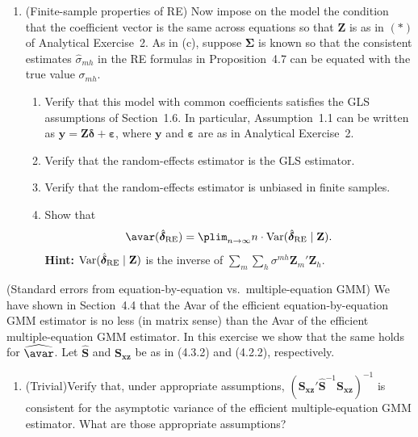 \begin{problemset}
\begin{enumerate}[label=(\alph*)]
\item (Finite-sample properties of RE)\quad
Now impose on the model the condition that the coefficient vector is the same
across equations so that $\mathbf{Z}$ is as in $(*)$ of Analytical Exercise~2.
As in (c), suppose $\boldsymbol{\Sigma}$ is known so that the consistent estimates
$\hat{\sigma}_{mh}$ in the RE formulas in Proposition~4.7 can be equated with
the true value $\sigma_{mh}$.
\begin{enumerate}[label=(\roman*)]
\item Verify that this model with common coefficients satisfies the GLS
assumptions of Section~1.6. In particular, Assumption~1.1 can be written as
$\mathbf{y} = \mathbf{Z}\boldsymbol{\delta} + \boldsymbol{\varepsilon}$,
where $\mathbf{y}$ and $\boldsymbol{\varepsilon}$ are as in Analytical Exercise~2.
\item Verify that the random-effects estimator is the GLS estimator.
\item Verify that the random-effects estimator is unbiased in finite samples.
\item Show that
\[
\avar(\hat{\boldsymbol{\delta}}_{\mathrm{RE}})
= \plim_{n \to \infty} n \cdot
\Var(\hat{\boldsymbol{\delta}}_{\mathrm{RE}} \mid \mathbf{Z}).
\]
\textbf{Hint:}
$\operatorname{Var}(\hat{\boldsymbol{\delta}}_{\mathrm{RE}} \mid \mathbf{Z})$ is the inverse of
$\sum_m \sum_h \sigma^{mh} \mathbf{Z}_m' \mathbf{Z}_h$.
\end{enumerate}
\end{enumerate}

\exercise[4]
(Standard errors from equation-by-equation vs.\ multiple-equation GMM)\quad
We have shown in Section~4.4 that the Avar of the efficient equation-by-equation
GMM estimator is no less (in matrix sense) than the Avar of the efficient
multiple-equation GMM estimator. In this exercise we show that the same
holds for $\widehat{\avar}$. Let $\widehat{\mathbf{S}}$ and
$\mathbf{S}_{\mathbf{xz}}$ be as in (4.3.2) and (4.2.2), respectively.

\begin{enumerate}[label=(\alph*)]
\item (Trivial)\quad Verify that, under appropriate assumptions,
$(\mathbf{S}_{\mathbf{xz}}' \widehat{\mathbf{S}}^{-1} \mathbf{S}_{\mathbf{xz}})^{-1}$
is consistent for the asymptotic variance of the efficient multiple-equation GMM
estimator. What are those appropriate assumptions?


\end{enumerate}
\end{problemset}
